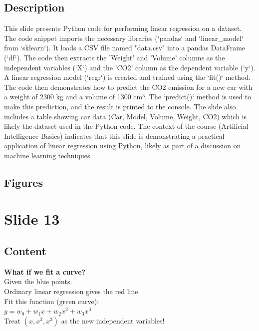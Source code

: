 \documentclass{article}%
\begin{document}
\subsection{Description}%
This slide presents Python code for performing linear regression on a dataset.  The code snippet imports the necessary libraries (`pandas` and `linear_model` from `sklearn`). It loads a CSV file named "data.csv" into a pandas DataFrame (`df`).  The code then extracts the 'Weight' and 'Volume' columns as the independent variables (`X`) and the 'CO2' column as the dependent variable (`y`).  A linear regression model (`regr`) is created and trained using the `fit()` method.  The code then demonstrates how to predict the CO2 emission for a new car with a weight of 2300 kg and a volume of 1300 cm³.  The `predict()` method is used to make this prediction, and the result is printed to the console.  The slide also includes a table showing car data (Car, Model, Volume, Weight, CO2) which is likely the dataset used in the Python code. The context of the course (Artificial Intelligence Basics) indicates that this slide is demonstrating a practical application of linear regression using Python, likely as part of a discussion on machine learning techniques.%
\subsection{Figures}%
\begin{figure}[H]%
\centering%
\end{figure}

%
\newpage%
\section{Slide 13}%
\label{sec:Slide13}%
\subsection{Content}%

\textbf{What if we fit a curve?} \\
Given the blue points. \\
Ordinary linear regression gives the red line. \\
Fit this function (green curve): \\
$y = w_0 + w_1x + w_2x^2 + w_3x^3$ \\
Treat $(x, x^2, x^3)$ as the new independent variables!
%
\end{document}

